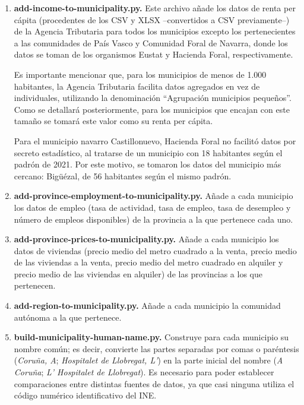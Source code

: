 \begin{enumerate}
    \item \textbf{add-income-to-municipality.py.} Este archivo añade los datos de renta per cápita (procedentes de los CSV y XLSX –convertidos a CSV previamente–) de la Agencia Tributaria para todos los municipios excepto los pertenecientes a las comunidades de País Vasco y Comunidad Foral de Navarra, donde los datos se toman de los organismos Eustat y Hacienda Foral, respectivamente.

    Es importante mencionar que, para los municipios de menos de 1.000 habitantes, la Agencia Tributaria facilita datos agregados en vez de individuales, utilizando la denominación ``Agrupación municipios pequeños''. Como se detallará posteriormente, para los municipios que encajan con este tamaño se tomará este valor como su renta per cápita.

    Para el municipio navarro Castillonuevo, Hacienda Foral no facilitó datos por secreto estadístico, al tratarse de un municipio con 18 habitantes según el padrón de 2021. Por este motivo, se tomaron los datos del municipio más cercano: Bigüézal, de 56 habitantes según el mismo padrón.

    \item \textbf{add-province-employment-to-municipality.py.} Añade a cada municipio los datos de empleo (tasa de actividad, tasa de empleo, tasa de desempleo y número de empleos disponibles) de la provincia a la que pertenece cada uno.
    
    \item \textbf{add-province-prices-to-municipality.py.} Añade a cada municipio los datos de viviendas (precio medio del metro cuadrado a la venta, precio medio de las viviendas a la venta, precio medio del metro cuadrado en alquiler y precio medio de las viviendas en alquiler) de las provincias a los que pertenecen.
    
    \item \textbf{add-region-to-municipality.py.} Añade a cada municipio la comunidad autónoma a la que pertenece.
    
    \item \textbf{build-municipality-human-name.py.} Construye para cada municipio su nombre común; es decir, convierte las partes separadas por comas o paréntesis (\textit{Coruña, A}; \textit{Hospitalet de Llobregat, L'}) en la parte inicial del nombre (\textit{A Coruña}; \textit{L' Hospitalet de Llobregat}). Es necesario para poder establecer comparaciones entre distintas fuentes de datos, ya que casi ninguna utiliza el código numérico identificativo del INE.
    

\end{enumerate}
